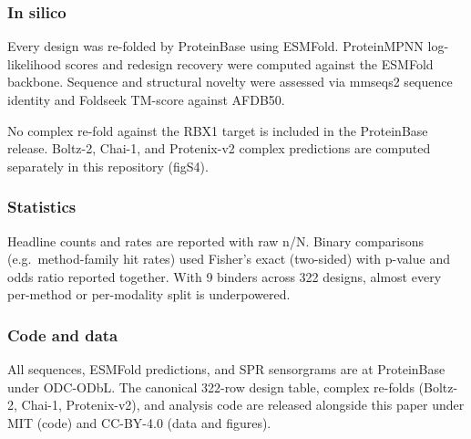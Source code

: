 \hypertarget{in-silico}{%
\subsubsection{In silico}\label{in-silico}}

Every design was re-folded by ProteinBase using ESMFold. ProteinMPNN
log-likelihood scores and redesign recovery were computed against the
ESMFold backbone. Sequence and structural novelty were assessed via
mmseqs2 sequence identity and Foldseek TM-score against AFDB50.

No complex re-fold against the RBX1 target is included in the
ProteinBase release. Boltz-2, Chai-1, and Protenix-v2 complex
predictions are computed separately in this repository (figS4).

\hypertarget{statistics}{%
\subsubsection{Statistics}\label{statistics}}

Headline counts and rates are reported with raw n/N. Binary comparisons
(e.g.~method-family hit rates) used Fisher's exact (two-sided) with
p-value and odds ratio reported together. With 9 binders across 322
designs, almost every per-method or per-modality split is underpowered.

\hypertarget{code-and-data}{%
\subsubsection{Code and data}\label{code-and-data}}

All sequences, ESMFold predictions, and SPR sensorgrams are at
ProteinBase under ODC-ODbL. The canonical 322-row design table, complex
re-folds (Boltz-2, Chai-1, Protenix-v2), and analysis code are released
alongside this paper under MIT (code) and CC-BY-4.0 (data and figures).
